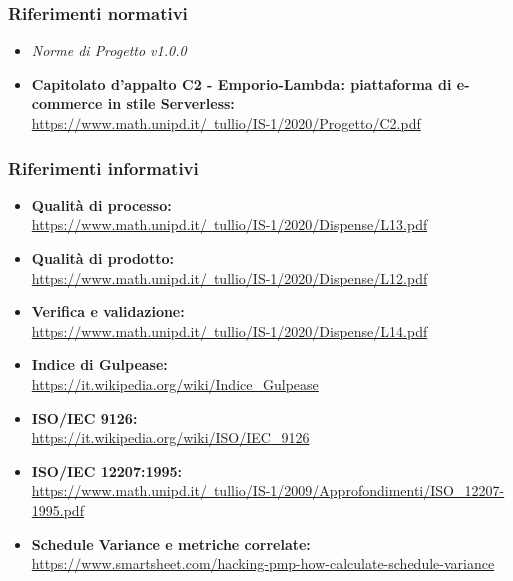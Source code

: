 \subsubsection{Riferimenti normativi}
\begin{itemize}
    \item \textit{Norme di Progetto v1.0.0}
    \item \textbf{Capitolato d'appalto C2 - Emporio-Lambda: piattaforma di e-commerce in stile Serverless:} \\ \href{https://www.math.unipd.it/~tullio/IS-1/2020/Progetto/C2.pdf}{https://www.math.unipd.it/~tullio/IS-1/2020/Progetto/C2.pdf}
\end{itemize}
\subsubsection{Riferimenti informativi}
\begin{itemize}
    \item \textbf{Qualità di processo:} \\ \href{https://www.math.unipd.it/~tullio/IS-1/2020/Dispense/L13.pdf}{https://www.math.unipd.it/~tullio/IS-1/2020/Dispense/L13.pdf}
    \item \textbf{Qualità di prodotto:} \\ \href{https://www.math.unipd.it/~tullio/IS-1/2020/Dispense/L12.pdf}{https://www.math.unipd.it/~tullio/IS-1/2020/Dispense/L12.pdf}
    \item \textbf{Verifica e validazione:} \\ \href{https://www.math.unipd.it/~tullio/IS-1/2020/Dispense/L14.pdf}{https://www.math.unipd.it/~tullio/IS-1/2020/Dispense/L14.pdf}
    \item \textbf{Indice di Gulpease:} \\ \href{https://it.wikipedia.org/wiki/Indice\_Gulpease}{https://it.wikipedia.org/wiki/Indice\_Gulpease}
    \item \textbf{ISO/IEC 9126:} \\ \href{https://it.wikipedia.org/wiki/ISO/IEC\_9126}{https://it.wikipedia.org/wiki/ISO/IEC\_9126}
    \item \textbf{ISO/IEC 12207:1995:} \\ \href{https://www.math.unipd.it/~tullio/IS-1/2009/Approfondimenti/ISO\_12207-1995.pdf}{https://www.math.unipd.it/~tullio/IS-1/2009/Approfondimenti/ISO\_12207-1995.pdf}
    \item \textbf{Schedule Variance e metriche correlate:} \\ \href{https://www.smartsheet.com/hacking-pmp-how-calculate-schedule-variance}{https://www.smartsheet.com/hacking-pmp-how-calculate-schedule-variance}
\end{itemize}
\newpage